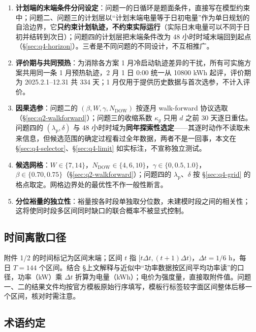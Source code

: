 \begin{enumerate}
  \item \textbf{计划端的末端条件分问设定}：问题一的日循环是题面条件，直接写在模型约束中；问题二、问题三的计划层以``计划末端电量等于日初电量''作为单日规划的自洽边界，它\textbf{只约束计划轨迹，不约束实际运行}（实际日末电量可以不同于日初并结转到次日）；问题四的计划层把末端条件改为 48 小时时域末端回到起点（\S\ref{sec:q4-horizon}）。三者是不同问题的不同设计，不互相推广。
  \item \textbf{评价期与共同预热}：为消除各方案 1 月冷启动轨迹差异的干扰，所有可实施方案共用同一条 1 月预热轨迹，2 月 1 日 0:00 统一从 10800 kWh 起评，评价期为 2025.2.1--12.31 共 334 天；1 月仅用于提供历史数据与首次选参，不计入评价。
  \item \textbf{因果选参}：问题二的 $(\beta,W,\gamma,N_{\mathrm{DOW}})$ 按逐月 walk-forward 协议选取（\S\ref{sec:q2-walkforward}）；问题三的收缩系数 $\kappa_g$ 只用 $d$ 之前 30 天逐日重估。问题四的 $(\lambda_{\mathrm{p}},\delta)$ 与 48 小时时域为\textbf{同年探索性选定}——其逐时动作不读取未来信息，但候选范围的确定过程看过全年数据，两者不是一回事，本文在 \S\ref{sec:q4-selector}、\S\ref{sec:q4-limit} 如实标注，不宣称独立测试。
  \item \textbf{候选网格}：$W\in\{7,14\}$，$N_{\mathrm{DOW}}\in\{4,6,10\}$，$\gamma\in\{0,0.5,1.0\}$，$\beta\in\{0.70,0.75\}$（\S\ref{sec:q2-walkforward}）；问题四的 $\lambda_{\mathrm{p}}$、$\delta$ 按 \S\ref{sec:q4-grid} 的格点取定。网格边界处的最优性不作一般性断言。
  \item \textbf{分位裕量的独立性}：裕量按各时段单独取分位数，未建模时段之间的相关性；这将使同时段多区间同时缺口的联合概率不被显式控制。
\end{enumerate}

\subsection{时间离散口径}

附件 1/2 的时间标记为区间末端；区间 $t$ 指 $[t\Delta t,(t+1)\Delta t)$，$\Delta t = 1/6$ h，每日 $T=144$ 个区间。结合 \S 上文解释与近似中``功率数据按区间平均功率读''的口径，功率（kW）乘 $\Delta t$ 折算为电量（kWh）；电价为强度量，直接取附件值。问题一、二的结果文件均按官方模板原始行序填写，模板行标签较字面区间整体后移一个区间，核对时需注意。

\subsection{术语约定}

